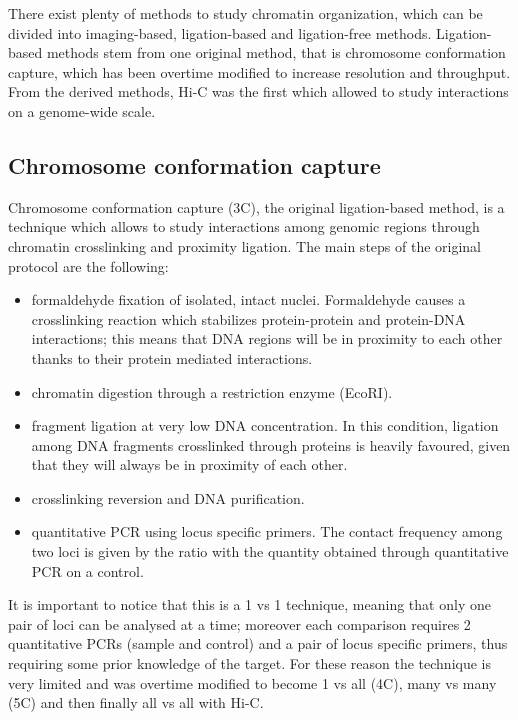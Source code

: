 There exist plenty of methods to study chromatin organization, which can be divided into imaging-based, ligation-based and ligation-free methods. Ligation-based methods stem from one original method, that is chromosome conformation capture, which has been overtime modified to increase resolution and throughput. From the derived methods, Hi-C was the first which allowed to study interactions on a genome-wide scale.

\subsection{Chromosome conformation capture}
Chromosome conformation capture (3C), the original ligation-based method, is a technique which allows to study interactions among genomic regions through chromatin crosslinking and proximity ligation\cite{3coriginal2002}. The main steps of the original protocol are the following:
\begin{itemize}\tightlist
  \item formaldehyde fixation of isolated, intact nuclei. Formaldehyde causes a crosslinking reaction which stabilizes protein-protein and protein-DNA interactions; this means that DNA regions will be in proximity to each other thanks to their protein mediated interactions. 
  \item chromatin digestion through a restriction enzyme (EcoRI).
  \item fragment ligation at very low DNA concentration. In this condition, ligation among DNA fragments crosslinked through proteins is heavily favoured, given that they will always be in proximity of each other.
  \item crosslinking reversion and DNA purification.
  \item quantitative PCR using locus specific primers. The contact frequency among two loci is given by the ratio with the quantity obtained through quantitative PCR on a control.
\end{itemize}
It is important to notice that this is a 1 vs 1 technique, meaning that only one pair of loci can be analysed at a time; moreover each comparison requires 2 quantitative PCRs (sample and control) and a pair of locus specific primers, thus requiring some prior knowledge of the target. For these reason the technique is very limited and was overtime modified to become 1 vs all (4C\cite{4cprotocol2006}), many vs many (5C\cite{5cprotocol2006}) and then finally all vs all with Hi-C.


